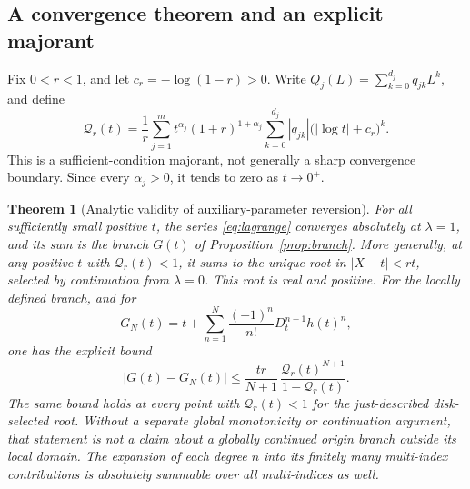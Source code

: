 \documentclass[11pt,a4paper]{article}
\newtheorem{theorem}{Theorem}[section]
\theoremstyle{definition}
\begin{document}
\subsection{A convergence theorem and an explicit majorant}
Fix \(0<r<1\), and let \(c_r=-\log(1-r)>0\). Write
\(Q_j(L)=\sum_{k=0}^{d_j}q_{jk}L^k\), and define
\begin{equation}\label{eq:majorant}
 \mathcal Q_r(t)=\frac1r\sum_{j=1}^{m}
 t^{\alpha_j}(1+r)^{1+\alpha_j}
 \sum_{k=0}^{d_j}|q_{jk}|\bigl(|\log t|+c_r\bigr)^k.
\end{equation}
This is a sufficient-condition majorant, not generally a sharp convergence
boundary. Since every \(\alpha_j>0\), it tends to zero as \(t\to0^+\).

\begin{theorem}[Analytic validity of auxiliary-parameter reversion]
\label{thm:convergence}
For all sufficiently small positive \(t\), the series \eqref{eq:lagrange}
converges absolutely at \(\lambda=1\), and its sum is the branch \(G(t)\)
of Proposition~\ref{prop:branch}. More generally, at any positive \(t\)
with \(\mathcal Q_r(t)<1\), it sums to the unique root in
\(|X-t|<rt\), selected by continuation from \(\lambda=0\).
This root is real and positive. For the locally defined branch, and for
\[
 G_N(t)=t+\sum_{n=1}^{N}\frac{(-1)^n}{n!}D_t^{n-1}h(t)^n,
\]
one has the explicit bound
\begin{equation}\label{eq:homotopy-bound}
 |G(t)-G_N(t)|\le
 \frac{t r}{N+1}\,
 \frac{\mathcal Q_r(t)^{N+1}}{1-\mathcal Q_r(t)}.
\end{equation}
The same bound holds at every point with \(\mathcal Q_r(t)<1\) for the
just-described disk-selected root. Without a separate global monotonicity or
continuation argument, that statement is not a claim about a globally
continued origin branch outside its local domain.
The expansion of each degree \(n\) into its finitely many multi-index
contributions is absolutely summable over all multi-indices as well.
\end{theorem}
\end{document}
